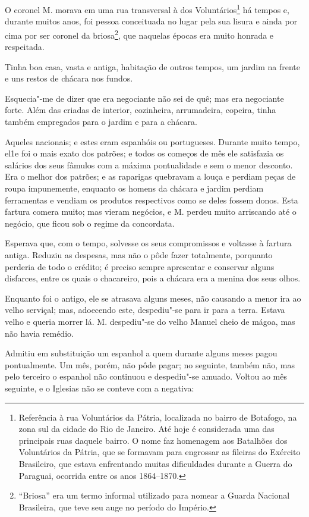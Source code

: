 O coronel M. morava em uma rua transversal à dos Voluntários\footnote{Referência
  à rua Voluntários da Pátria, localizada no bairro de Botafogo, na zona
  sul da cidade do Rio de Janeiro. Até hoje é considerada uma das
  principais ruas daquele bairro. O nome faz homenagem aos Batalhões dos
  Voluntários da Pátria, que se formavam para engrossar as fileiras do
  Exército Brasileiro, que estava enfrentando muitas dificuldades
  durante a Guerra do Paraguai, ocorrida entre os anos 1864--1870.} há
tempos e, durante muitos anos, foi pessoa conceituada no lugar pela sua
lisura e ainda por cima por ser coronel da briosa\footnote{``Briosa''
  era um termo informal utilizado para nomear a Guarda Nacional
  Brasileira, que teve seu auge no período do Império.}, que naquelas
épocas era muito honrada e respeitada.

Tinha boa casa, vasta e antiga, habitação de outros tempos, um jardim na
frente e uns restos de chácara nos fundos.

Esquecia"-me de dizer que era negociante não sei de quê; mas era
negociante forte. Além das criadas de interior, cozinheira, arrumadeira,
copeira, tinha também empregados para o jardim e para a chácara.

Aqueles nacionais; e estes eram espanhóis ou portugueses. Durante muito
tempo, el1e foi o mais exato dos patrões; e todos os começos de mês ele
satisfazia os salários dos seus fâmulos com a máxima pontualidade e sem
o menor desconto. Era o melhor dos patrões; e as raparigas quebravam a
louça e perdiam peças de roupa impunemente, enquanto os homens da
chácara e jardim perdiam ferramentas e vendiam os produtos respectivos
como se deles fossem donos. Esta fartura comera muito; mas vieram
negócios, e M. perdeu muito arriscando até o negócio, que ficou sob o
regime da concordata.

Esperava que, com o tempo, solvesse os seus compromissos e voltasse à
fartura antiga. Reduziu as despesas, mas não o pôde fazer totalmente,
porquanto perderia de todo o crédito; é preciso sempre apresentar e
conservar alguns disfarces, entre os quais o chacareiro, pois a chácara
era a menina dos seus olhos.

Enquanto foi o antigo, ele se atrasava alguns meses, não causando a
menor ira ao velho serviçal; mas, adoecendo este, despediu"-se para ir
para a terra. Estava velho e queria morrer lá. M. despediu"-se do velho
Manuel cheio de mágoa, mas não havia remédio.

Admitiu em substituição um espanhol a quem durante alguns meses pagou
pontualmente. Um mês, porém, não pôde pagar; no seguinte, também não,
mas pelo terceiro o espanhol não continuou e despediu"-se amuado. Voltou
ao mês seguinte, e o Iglesias não se conteve com a negativa:

